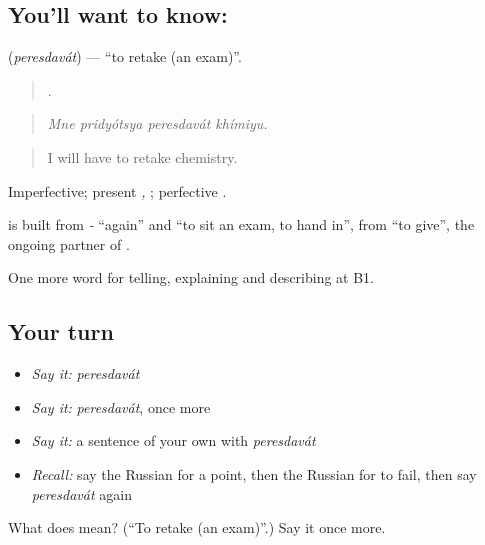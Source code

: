 \subsection*{You'll want to know: }
\textbf{} (\emph{peresdavát}) — \textquotedblleft{}to retake (an exam)\textquotedblright{}.

\begin{quote}
   .
\end{quote}

\begin{quote}
\emph{Mne pridyótsya peresdavát khímiyu.}
\end{quote}

\begin{quote}
I will have to retake chemistry.
\end{quote}

Imperfective; present \emph{, }; perfective \emph{}.

\begin{cousinweb}
\textbf{} is built from \emph{-} \textquotedblleft{}again\textquotedblright{} and \emph{} \textquotedblleft{}to sit an exam, to hand in\textquotedblright{}, from \emph{} \textquotedblleft{}to give\textquotedblright{}, the ongoing partner of \emph{}.
\end{cousinweb}

\begin{grammarlens}[title={What you've built}]
One more word for telling, explaining and describing at B1.
\end{grammarlens}

\subsection*{Your turn}
\begin{itemize}
\raggedright
  \item \emph{Say it:} \emph{peresdavát}
  \item \emph{Say it:} \emph{peresdavát}, once more
  \item \emph{Say it:} a sentence of your own with \emph{peresdavát}
  \item \emph{Recall:} say the Russian for a point, then the Russian for to fail, then say \emph{peresdavát} again
\end{itemize}

\begin{tcolorbox}[breakable,colback=teal!4,colframe=teal!35!black,title={Before you move on}]
What does  mean? (\textquotedblleft{}To retake (an exam)\textquotedblright{}.) Say it once more.
\end{tcolorbox}
